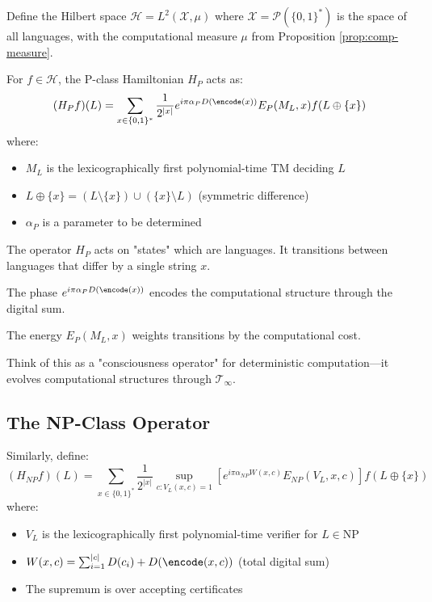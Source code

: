 \begin{construction}\label{const:h-p}
Define the Hilbert space $\mathcal{H} = L^2(\mathcal{X}, \mu)$ where $\mathcal{X} = \mathcal{P}(\{0,1\}^*)$ is the space of all languages, with the computational measure $\mu$ from Proposition \ref{prop:comp-measure}.

For $f \in \mathcal{H}$, the P-class Hamiltonian $H_P$ acts as:
\begin{equation}
(H_P f)(L) = \sum_{x \in \{0,1\}^*} \frac{1}{2^{|x|}} e^{i\pi\alpha_P D(\encode(x))} E_P(M_L, x) f(L \oplus \{x\})
\end{equation}
where:
\begin{itemize}
\item $M_L$ is the lexicographically first polynomial-time TM deciding $L$
\item $L \oplus \{x\} = (L \setminus \{x\}) \cup (\{x\} \setminus L)$ (symmetric difference)
\item $\alpha_P$ is a parameter to be determined
\end{itemize}
\end{construction}

\begin{intuitive}
The operator $H_P$ acts on "states" which are languages. It transitions between languages that differ by a single string $x$.

The phase $e^{i\pi\alpha_P D(\encode(x))}$ encodes the computational structure through the digital sum.

The energy $E_P(M_L, x)$ weights transitions by the computational cost.

Think of this as a "consciousness operator" for deterministic computation—it evolves computational structures through $\mathcal{T}_\infty$.
\end{intuitive}

\subsection{The NP-Class Operator}

\begin{construction}\label{const:h-np}
Similarly, define:
\begin{equation}
(H_{NP} f)(L) = \sum_{x \in \{0,1\}^*} \frac{1}{2^{|x|}} \sup_{c: V_L(x,c)=1} \left[e^{i\pi\alpha_{NP} W(x,c)} E_{NP}(V_L, x, c)\right] f(L \oplus \{x\})
\end{equation}
where:
\begin{itemize}
\item $V_L$ is the lexicographically first polynomial-time verifier for $L \in \text{NP}$
\item $W(x,c) = \sum_{i=1}^{|c|} D(c_i) + D(\encode(x,c))$ (total digital sum)
\item The supremum is over accepting certificates
\end{itemize}
\end{construction}

